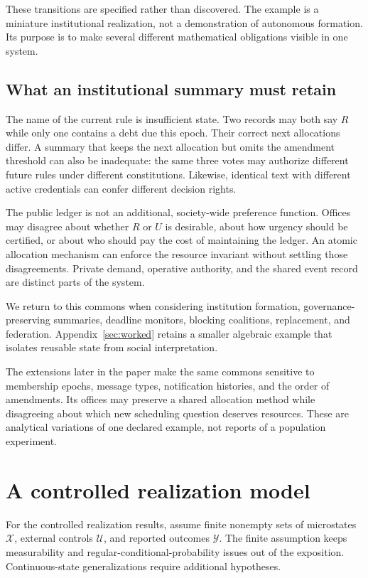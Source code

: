 \documentclass[11pt,letterpaper]{article}
\theoremstyle{plain}
\theoremstyle{definition}
\theoremstyle{remark}
\newcommand{\X}{\mathcal X}
\newcommand{\U}{\mathcal U}
\newcommand{\Y}{\mathcal Y}
\begin{document}
These transitions are specified rather than discovered. The example is a miniature institutional realization, not a demonstration of autonomous formation. Its purpose is to make several different mathematical obligations visible in one system.

\subsection{What an institutional summary must retain}
The name of the current rule is insufficient state. Two records may both say $R$ while only one contains a debt due this epoch. Their correct next allocations differ. A summary that keeps the next allocation but omits the amendment threshold can also be inadequate: the same three votes may authorize different future rules under different constitutions. Likewise, identical text with different active credentials can confer different decision rights.

The public ledger is not an additional, society-wide preference function. Offices may disagree about whether $R$ or $U$ is desirable, about how urgency should be certified, or about who should pay the cost of maintaining the ledger. An atomic allocation mechanism can enforce the resource invariant without settling those disagreements. Private demand, operative authority, and the shared event record are distinct parts of the system.

We return to this commons when considering institution formation, governance-preserving summaries, deadline monitors, blocking coalitions, replacement, and federation. Appendix~\ref{sec:worked} retains a smaller algebraic example that isolates reusable state from social interpretation.

The extensions later in the paper make the same commons sensitive to membership epochs, message types, notification histories, and the order of amendments. Its offices may preserve a shared allocation method while disagreeing about which new scheduling question deserves resources. These are analytical variations of one declared example, not reports of a population experiment.

\section{A controlled realization model}\label{sec:model}
For the controlled realization results, assume finite nonempty sets of microstates $\X$, external controls $\U$, and reported outcomes $\Y$. The finite assumption keeps measurability and regular-conditional-probability issues out of the exposition. Continuous-state generalizations require additional hypotheses.
\end{document}
